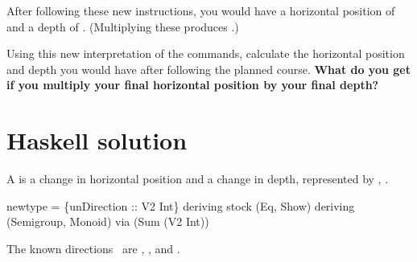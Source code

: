 After following these new instructions, you would have a horizontal position of  and a depth of . (Multiplying these produces .)

Using this new interpretation of the commands, calculate the horizontal position and depth you would have after following the planned course. \textbf{What do you get if you multiply your final horizontal position by your final depth?}
\nwenddocs{}\newpage
\section{Haskell solution}

A {\Tt{}\nwendquote} is a change in horizontal position and a change in depth,
represented by , .

\nwenddocs{}\endmoddef\nwstartdeflinemarkup{}\nwenddeflinemarkup
newtype  =  \{unDirection :: V2 Int\}
  deriving stock (Eq, Show)
  deriving
    (Semigroup, Monoid)
    via (Sum (V2 Int))

\eatline
{}\nwendcode{}\nwdocspar
The {\Tt{}\LA{}known directions~{\nwtagstyle{}}\RA{}\nwendquote} are {\Tt{}\nwendquote}, {\Tt{}\nwendquote}, and {\Tt{}\nwendquote}.

